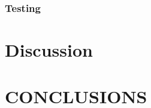 \documentclass[letterpaper, 10 pt, conference]{ieeeconf}   %
\begin{document}
\subsubsection{Testing}

\section{Discussion}


\section{CONCLUSIONS}


\addtolength{\textheight}{-12cm}   %









\end{document}
